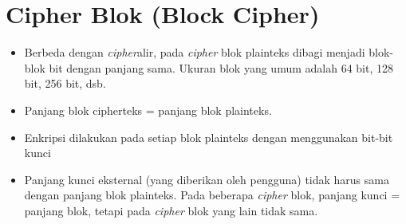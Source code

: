 \documentclass{article}
\begin{document}

\section*{Cipher Blok (Block Cipher)}

\begin{itemize}
    \item Berbeda dengan \textit{cipher}alir, pada \textit{cipher} blok plainteks dibagi menjadi blok-blok bit dengan panjang sama. Ukuran blok yang umum adalah 64 bit, 128 bit, 256 bit, dsb.
    \item Panjang blok cipherteks = panjang blok plainteks.
    \item Enkripsi dilakukan pada setiap blok plainteks dengan menggunakan bit-bit kunci
    \item Panjang kunci eksternal (yang diberikan oleh pengguna) tidak harus sama dengan panjang blok plainteks. Pada beberapa \textit{cipher} blok, panjang kunci = panjang blok, tetapi pada \textit{cipher} blok yang lain tidak sama.
\end{itemize}
\end{document}
